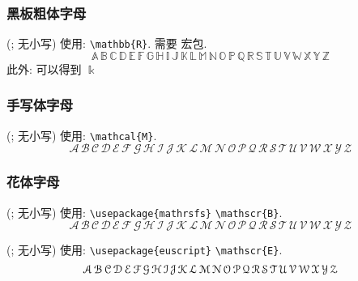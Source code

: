 \subsubsection{黑板粗体字母 }
(; 无小写)
使用: \verb'\mathbb{R}'.  需要 宏包.
\[
\mathbb{A}\,\mathbb{B}\,\mathbb{C}\,\mathbb{D}\,\mathbb{E}\,\mathbb{F}
\,\mathbb{G}\,\mathbb{H}\,\mathbb{I}\,\mathbb{J}\,\mathbb{K}\,\mathbb{L}
\,\mathbb{M}\,\mathbb{N}\,\mathbb{O}\,\mathbb{P}\,\mathbb{Q}\,\mathbb{R}
\,\mathbb{S}\,\mathbb{T}\,\mathbb{U}\,\mathbb{V}\,\mathbb{W}\,\mathbb{X}
\,\mathbb{Y}\,\mathbb{Z}
\]
此外:\qquad  {} 可以得到 \quad $\Bbbk$

\subsubsection{手写体字母}
 (; 无小写)  使用: \verb'\mathcal{M}'.
\[
\mathcal{A}\,\mathcal{B}\,\mathcal{C}\,\mathcal{D}\,\mathcal{E}
\,\mathcal{F}\,\mathcal{G}\,\mathcal{H}\,\mathcal{I}\,\mathcal{J}
\,\mathcal{K}\,\mathcal{L}\,\mathcal{M}\,\mathcal{N}\,\mathcal{O}
\,\mathcal{P}\,\mathcal{Q}\,\mathcal{R}\,\mathcal{S}\,\mathcal{T}
\,\mathcal{U}\,\mathcal{V}\,\mathcal{W}\,\mathcal{X}\,\mathcal{Y}
\,\mathcal{Z}
\]

\subsubsection{花体字母}
(; 无小写) 使用: \verb'\usepackage{mathrsfs}' \verb'\mathscr{B}'.
\[
\mathscr{A}\,\mathscr{B}\,\mathscr{C}\,\mathscr{D}\,\mathscr{E}
\,\mathscr{F}\,\mathscr{G}\,\mathscr{H}\,\mathscr{I}\,\mathscr{J}
\,\mathscr{K}\,\mathscr{L}\,\mathscr{M}\,\mathscr{N}\,\mathscr{O}
\,\mathscr{P}\,\mathscr{Q}\,\mathscr{R}\,\mathscr{S}\,\mathscr{T}
\,\mathscr{U}\,\mathscr{V}\,\mathscr{W}\,\mathscr{X}\,\mathscr{Y}
\,\mathscr{Z}
\]

\begingroup
(; 无小写) 使用: \verb'\usepackage{euscript}' \verb'\mathscr{E}'.
\renewcommand{\mathscr}{\EuScript}
\[
\mathscr{A}\,\mathscr{B}\,\mathscr{C}\,\mathscr{D}\,\mathscr{E}
\,\mathscr{F}\,\mathscr{G}\,\mathscr{H}\,\mathscr{I}\,\mathscr{J}
\,\mathscr{K}\,\mathscr{L}\,\mathscr{M}\,\mathscr{N}\,\mathscr{O}
\,\mathscr{P}\,\mathscr{Q}\,\mathscr{R}\,\mathscr{S}\,\mathscr{T}
\,\mathscr{U}\,\mathscr{V}\,\mathscr{W}\,\mathscr{X}\,\mathscr{Y}
\,\mathscr{Z}
\]
\endgroup

